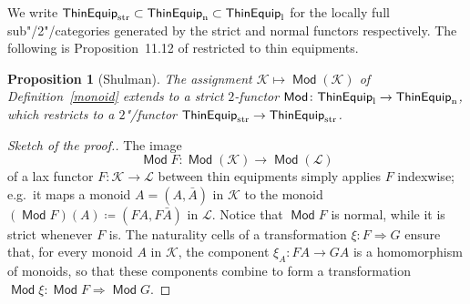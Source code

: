 \documentclass[preprint, a4paper]{elsarticle}
\newtheorem{proposition}[theorem]{Proposition}
\theoremstyle{definition}
\theoremstyle{remark}
\providecommand{\defref}[1]{Definition~\ref{#1}}
\providecommand{\dfn}{\coloneqq}
\providecommand{\natarrow}{\Rightarrow}
\providecommand{\map}[3]{#1\colon#2\to#3}
\providecommand{\nat}[3]{#1\colon#2\natarrow#3}
\providecommand{\catvar}[1]{\mathcal{#1}}
\providecommand{\2}{\mathsf 2}
\providecommand{\K}{\catvar K}
\providecommand{\ThinEq}{\mathsf{ThinEquip}}
\providecommand{\lThinEq}{\ThinEq_\textup l}
\providecommand{\nThinEq}{\ThinEq_\textup n}
\providecommand{\strThinEq}{\ThinEq_\textup{str}}
\DeclareMathOperator{\Mod}{\mathsf{Mod}}
\begin{document}
  We write $\strThinEq \subset \nThinEq \subset \lThinEq$ for the locally full sub"/2"/categories generated by the strict and normal functors respectively. The following is Proposition~11.12 of \cite{Shulman08} restricted to thin equipments.
	\begin{proposition}[Shulman] \label{2-functor Mod}
		The assignment $\K \mapsto \Mod(\K)$ of \defref{monoid} extends to a strict $2$-functor $\map\Mod\lThinEq\nThinEq$, which restricts to a $2$"/functor $\strThinEq \to \strThinEq$.
	\end{proposition}
	\begin{proof}[Sketch of the proof.]
		The image
		\begin{displaymath}
			\map{\Mod F}{\Mod(\K)}{\Mod(\mathcal L)}
		\end{displaymath}
		of a lax functor $\map F\K\mathcal L$ between thin equipments simply applies $F$ indexwise; e.g.\ it maps a monoid $A = (A, \bar A)$ in $\K$ to the monoid $(\Mod F)(A) \dfn (FA, F\bar A)$ in $\mathcal L$. Notice that $\Mod F$ is normal, while it is strict whenever $F$ is. The naturality cells of a transformation $\nat\xi FG$ ensure that, for every monoid $A$ in $\K$, the component $\map{\xi_A}{FA}{GA}$ is a homomorphism of monoids, so that these components combine to form a transformation $\nat{\Mod\xi}{\Mod F}{\Mod G}$.
	\end{proof}

  
\end{document}
